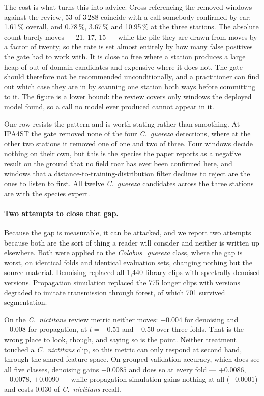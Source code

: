 \documentclass[review,3p,times]{elsarticle}
\begin{document}
The cost is what turns this into advice. Cross-referencing the removed windows
against the review, 53 of 3\,288 coincide with a call somebody confirmed by ear:
1.61\,\% overall, and 0.78\,\%, 3.67\,\% and 10.95\,\% at the three stations. The
absolute count barely moves --- 21, 17, 15 --- while the pile they are drawn from
moves by a factor of twenty, so the rate is set almost entirely by how many
false positives the gate had to work with. It is close to free where a station
produces a large heap of out-of-domain candidates and expensive where it does
not. The gate should therefore not be recommended unconditionally, and a
practitioner can find out which case they are in by scanning one station both
ways before committing to it. The figure is a lower bound: the review covers
only windows the deployed model found, so a call no model ever produced cannot
appear in it.

One row resists the pattern and is worth stating rather than smoothing. At
IPA4ST the gate removed none of the four \textit{C.\ guereza} detections, where
at the other two stations it removed one of one and two of three. Four windows
decide nothing on their own, but this is the species the paper reports as a
negative result on the ground that no field roar has ever been confirmed here,
and windows that a distance-to-training-distribution filter declines to reject
are the ones to listen to first. All twelve \textit{C.\ guereza} candidates
across the three stations are with the species expert.

\paragraph{Two attempts to close that gap.} Because the gap is measurable, it
can be attacked, and we report two attempts because both are the sort of thing a
reader will consider and neither is written up elsewhere. Both were applied to
the \textit{Colobus\_guereza} class, where the gap is worst, on identical folds
and identical evaluation sets, changing nothing but the source material.
Denoising replaced all 1{,}440 library clips with spectrally denoised versions.
Propagation simulation replaced the 775 longer clips with versions
degraded to imitate transmission through forest, of which 701 survived
segmentation.

On the \textit{C.\ nictitans} review metric neither moves: $-0.004$ for
denoising and $-0.008$ for propagation, at $t = -0.51$ and $-0.50$ over three
folds. That is the wrong place to look, though, and saying so is the point.
Neither treatment touched a \textit{C.\ nictitans} clip, so this metric can only
respond at second hand, through the shared feature space. On grouped validation
accuracy, which does see all five classes, denoising gains $+0.0085$ and does so
at every fold --- $+0.0086$, $+0.0078$, $+0.0090$ --- while propagation
simulation gains nothing at all ($-0.0001$) and costs 0.030 of
\textit{C.\ nictitans} recall.
\end{document}
